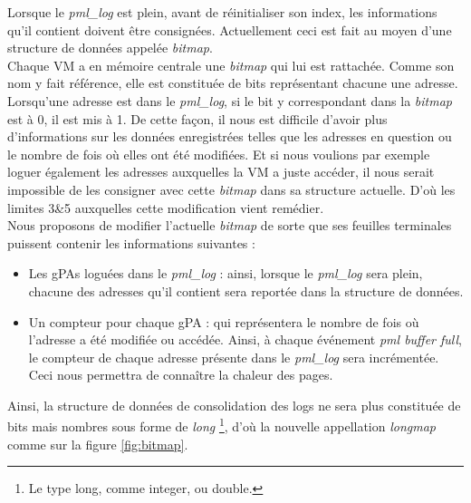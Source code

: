 Lorsque le \textit{pml\_log} est plein, avant de réinitialiser son index, les informations qu'il contient doivent être consignées. Actuellement ceci est fait au moyen d'une structure de données appelée \textit{bitmap}.\\
Chaque VM a en mémoire centrale une \textit{bitmap} qui lui est rattachée. Comme son nom y fait référence, elle est constituée de bits représentant chacune une adresse. Lorsqu'une adresse est dans le \textit{pml\_log}, si le bit y correspondant dans la \textit{bitmap} est à 0, il est mis à 1. De cette façon, il nous est difficile d'avoir plus d'informations sur les données enregistrées telles que les adresses en question ou le nombre de fois où elles ont été modifiées. Et si nous voulions par exemple loguer également les adresses auxquelles la VM a juste accéder, il nous serait impossible de les consigner avec cette \textit{bitmap} dans sa structure actuelle. D'où les limites 3\&5 auxquelles cette modification vient remédier.\\
Nous proposons de modifier l'actuelle \textit{bitmap} de sorte que ses feuilles terminales puissent contenir les informations suivantes :
\begin{itemize}
    \item Les gPAs loguées dans le \textit{pml\_log} : ainsi, lorsque le \textit{pml\_log} sera plein, chacune des adresses qu'il contient sera reportée dans la structure de données.
    \item Un compteur pour chaque gPA : qui représentera le nombre de fois où l'adresse a été modifiée ou accédée. Ainsi, à chaque événement \textit{pml buffer full}, le compteur de chaque adresse présente dans le \textit{pml\_log} sera incrémentée. Ceci nous permettra de connaître la chaleur des pages.
\end{itemize}

\noindent Ainsi, la structure de données de consolidation des logs ne sera plus constituée de bits mais nombres sous forme de \textit{long} \footnote{Le type long, comme integer, ou double.}, d'où la nouvelle appellation \textit{longmap} comme sur la figure \ref{fig:bitmap}.

